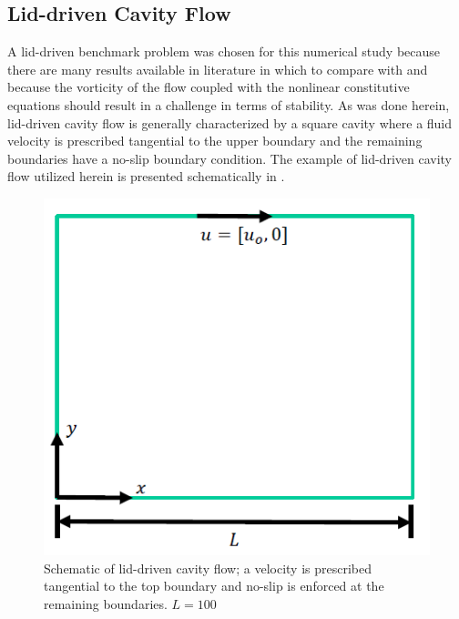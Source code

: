 \subsection{Lid-driven Cavity Flow} %

A lid-driven benchmark problem was chosen for this numerical study because there are many results available in literature in which to compare with and because the vorticity of the flow coupled with the nonlinear constitutive equations should result in a challenge in terms of stability.
As was done herein, lid-driven cavity flow is generally characterized by a square cavity where a fluid velocity is prescribed tangential to the upper boundary and the remaining boundaries have a no-slip boundary condition.
The example of lid-driven cavity flow utilized herein is presented schematically in .

\begin{figure}
\centering
\includegraphics{figs/lid-driven}
\caption{Schematic of lid-driven cavity flow; a velocity is prescribed tangential to the top boundary and no-slip is enforced at the remaining boundaries. $L = 100$}
\label{fig:lid-driven}
\end{figure}

